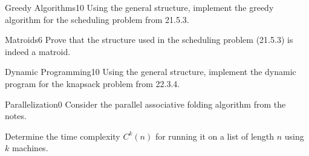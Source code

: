 \documentclass[a4paper]{article}
\begin{document}
\header

\begin{problem}{Greedy Algorithms}{10}
Using the general structure, implement the greedy algorithm for the scheduling problem from 21.5.3.
\end{problem}

\begin{problem}{Matroids}{6}
Prove that the structure used in the scheduling problem (21.5.3) is indeed a matroid.
\end{problem}

\begin{problem}{Dynamic Programming}{10}
Using the general structure, implement the dynamic program for the knapsack problem from 22.3.4.
\end{problem}

\begin{problem}{Parallelization}{0}
Consider the parallel associative folding algorithm from the notes.

Determine the time complexity $C^k(n)$ for running it on a list of length $n$ using $k$ machines.
\end{problem}
\end{document}
